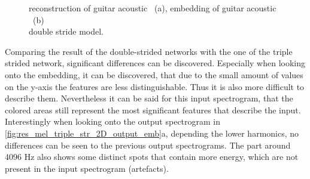 \begin{figure}[htb!]
    \centering
    \captionsetup{justification=centering}
    \caption{reconstruction of guitar acoustic ~(a), embedding of guitar acoustic ~(b)\\double stride model.}
    \label{fig:res_mel_double_str_2D_output_emb}
\end{figure}

Comparing the result of the double-strided networks with the one of the triple strided network, significant differences can be discovered. Especially when looking onto the embedding, it can be discovered, that due to the small amount of values on the y-axis the features are less distinguishable. Thus it is also more difficult to describe them. Nevertheless it can be said for this input spectrogram, that the colored areas still represent the most significant features that describe the input. Interestingly when looking onto the output spectrogram in \ref{fig:res_mel_triple_str_2D_output_emb}a, depending the lower harmonics, no differences can be seen to the previous output spectrograms. The part around 4096 Hz also shows some distinct spots that contain more energy, which are not present in the input spectrogram (artefacts).

